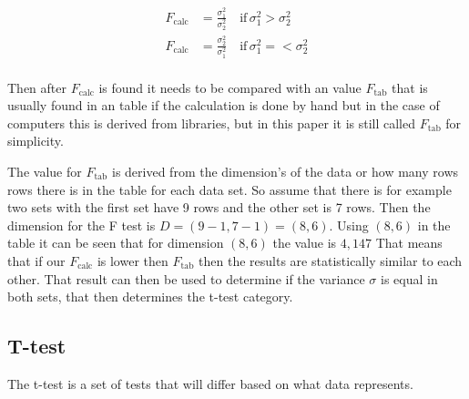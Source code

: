 \begin{align*}
F_{\text{calc}} &= \frac{\sigma^2_1}{\sigma^2_2}\quad\text{if}\, \sigma^2_1 > \sigma^2_2\\
F_{\text{calc}} &= \frac{\sigma^2_2}{\sigma^2_1}\quad\text{if}\, \sigma^2_1 =< \sigma^2_2\\
\end{align*}

Then after $F_{\text{calc}}$ is found it needs to be compared with an value
$F_{\text{tab}}$ that is usually found in an table if the calculation is done by hand but in the case of computers this is derived from libraries, but in this paper it is still called $F_{\text{tab}}$ for simplicity.
\par
The value for $F_{\text{tab}}$ is derived from the dimension's of the data or how many rows rows there is in the table for each data set.
So assume that there is for example two sets with the first set have 9 rows and the other set is 7 rows. Then the dimension for the F test is $D = (9-1, 7-1)= (8,6)$.
Using $(8,6)$ in the table \cite[p.~488]{alm2008stokastik} it can be seen that for dimension $(8,6)$ the value is $4,147$
That means that if our $F_{\text{calc}}$ is lower then $F_{\text{tab}}$ then the results are statistically similar to each other.
That result can then be used to determine if the variance $\sigma$ is equal in both sets, that then determines the t-test category.

\subsection{T-test}\label{sub:implement:ttest}
The t-test is a set of tests that will differ based on what data represents.




